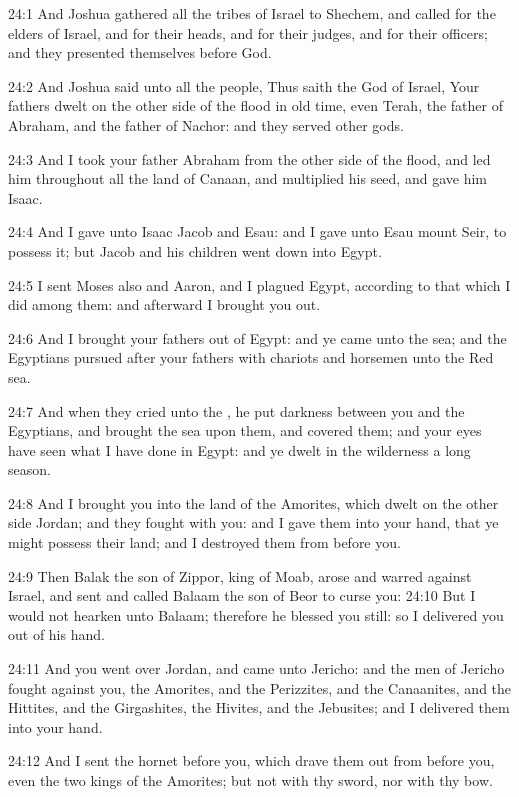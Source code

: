 24:1 And Joshua gathered all the tribes of Israel to Shechem, and called for the elders of Israel, and for their heads, and for their judges, and for their officers; and they presented themselves before God.

24:2 And Joshua said unto all the people, Thus saith the \LORD God of Israel, Your fathers dwelt on the other side of the flood in old time, even Terah, the father of Abraham, and the father of Nachor: and they served other gods.

24:3 And I took your father Abraham from the other side of the flood, and led him throughout all the land of Canaan, and multiplied his seed, and gave him Isaac.

24:4 And I gave unto Isaac Jacob and Esau: and I gave unto Esau mount Seir, to possess it; but Jacob and his children went down into Egypt.

24:5 I sent Moses also and Aaron, and I plagued Egypt, according to that which I did among them: and afterward I brought you out.

24:6 And I brought your fathers out of Egypt: and ye came unto the sea; and the Egyptians pursued after your fathers with chariots and horsemen unto the Red sea.

24:7 And when they cried unto the \LORD, he put darkness between you and the Egyptians, and brought the sea upon them, and covered them; and your eyes have seen what I have done in Egypt: and ye dwelt in the wilderness a long season.

24:8 And I brought you into the land of the Amorites, which dwelt on the other side Jordan; and they fought with you: and I gave them into your hand, that ye might possess their land; and I destroyed them from before you.

24:9 Then Balak the son of Zippor, king of Moab, arose and warred against Israel, and sent and called Balaam the son of Beor to curse you: 24:10 But I would not hearken unto Balaam; therefore he blessed you still: so I delivered you out of his hand.

24:11 And you went over Jordan, and came unto Jericho: and the men of Jericho fought against you, the Amorites, and the Perizzites, and the Canaanites, and the Hittites, and the Girgashites, the Hivites, and the Jebusites; and I delivered them into your hand.

24:12 And I sent the hornet before you, which drave them out from before you, even the two kings of the Amorites; but not with thy sword, nor with thy bow.

